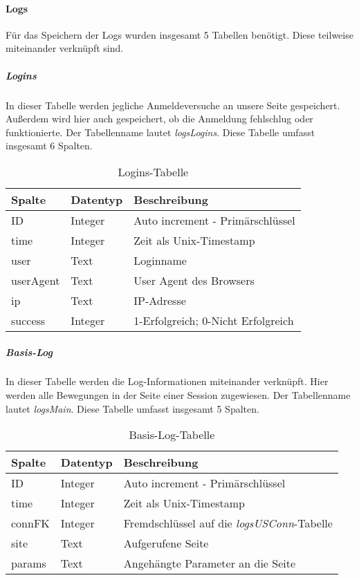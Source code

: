 \paragraph{Logs\\}
Für das Speichern der Logs wurden insgesamt 5 Tabellen benötigt. Diese teilweise miteinander verknüpft sind.

\subparagraph{Logins\\}
In dieser Tabelle werden jegliche Anmeldeversuche an unsere Seite gespeichert. Außerdem wird hier auch gespeichert, ob die Anmeldung fehlschlug oder funktionierte. Der Tabellenname lautet \textit{logsLogins}. Diese Tabelle umfasst insgesamt 6 Spalten.

\begin{table}[H]
\centering
\begin{tabular}{p{2.5 cm}p{2.5 cm}p{10 cm}}
   \toprule
   \textbf{Spalte} & \textbf{Datentyp} & \textbf{Beschreibung} \\
   \midrule
          ID & Integer & Auto increment - Primärschlüssel  \\
          \hline
          time & Integer & Zeit als Unix-Timestamp   \\
          \hline
	      user & Text & Loginname   \\
	      \hline
          userAgent & Text & User Agent des Browsers   \\
          \hline
          ip & Text & IP-Adresse  \\
          \hline
          success & Integer & 1-Erfolgreich; 0-Nicht Erfolgreich  \\
   \bottomrule
\end{tabular}
\caption{Logins-Tabelle}
\end{table}

\subparagraph{Basis-Log\\}
In dieser Tabelle werden die Log-Informationen miteinander verknüpft. Hier werden alle Bewegungen in der Seite einer Session zugewiesen. Der Tabellenname lautet \textit{logsMain}. Diese Tabelle umfasst insgesamt 5 Spalten.

\begin{table}[H]
\centering
\begin{tabular}{p{2.5 cm}p{2.5 cm}p{10 cm}}
   \toprule
   \textbf{Spalte} & \textbf{Datentyp} & \textbf{Beschreibung} \\
   \midrule
          ID & Integer & Auto increment - Primärschlüssel  \\
          \hline
          time & Integer & Zeit als Unix-Timestamp   \\
          \hline
	      connFK & Integer & Fremdschlüssel auf die \textit{logsUSConn}-Tabelle   \\
	      \hline
          site & Text & Aufgerufene Seite   \\
          \hline
          params & Text & Angehängte Parameter an die Seite  \\
   \bottomrule
\end{tabular}
\caption{Basis-Log-Tabelle}
\end{table}

